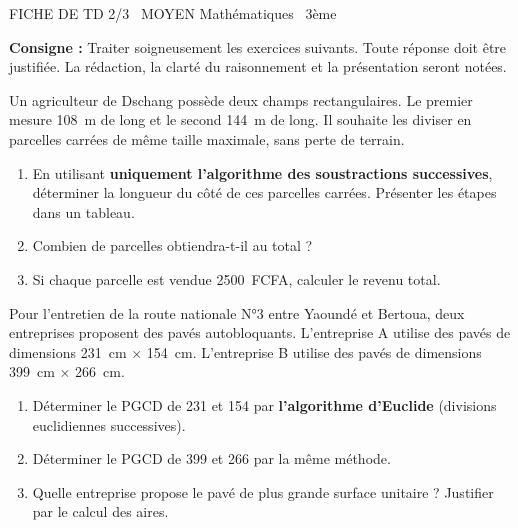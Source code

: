 \documentclass[11pt]{article}
\begin{document}
\begin{tcolorbox}[enhanced,colback=popink,colframe=popink,arc=10pt,boxrule=0pt,left=12pt,right=12pt,top=9pt,bottom=9pt]
{\color{white}\popxbold\small FICHE DE TD 2/3 \textbullet\ MOYEN \hfill Mathématiques \textbullet\ 3ème\par}
\end{tcolorbox}
\vspace{4pt}
\noindent\textbf{Consigne :} Traiter soigneusement les exercices suivants. Toute réponse doit être justifiée. La rédaction, la clarté du raisonnement et la présentation seront notées.

\begin{exercice}
Un agriculteur de Dschang possède deux champs rectangulaires. Le premier mesure \SI{108}{m} de long et le second \SI{144}{m} de long. Il souhaite les diviser en parcelles carrées de même taille maximale, sans perte de terrain.
\begin{enumerate}
    \item En utilisant \textbf{uniquement l'algorithme des soustractions successives}, déterminer la longueur du côté de ces parcelles carrées. Présenter les étapes dans un tableau.
    \item Combien de parcelles obtiendra-t-il au total ?
    \item Si chaque parcelle est vendue \SI{2500}{FCFA}, calculer le revenu total.
\end{enumerate}
\end{exercice}

\begin{exercice}
Pour l'entretien de la route nationale N°3 entre Yaoundé et Bertoua, deux entreprises proposent des pavés autobloquants. L'entreprise A utilise des pavés de dimensions \SI{231}{cm} $\times$ \SI{154}{cm}. L'entreprise B utilise des pavés de dimensions \SI{399}{cm} $\times$ \SI{266}{cm}.
\begin{enumerate}
    \item Déterminer le PGCD de 231 et 154 par \textbf{l'algorithme d'Euclide} (divisions euclidiennes successives).
    \item Déterminer le PGCD de 399 et 266 par la même méthode.
    \item Quelle entreprise propose le pavé de plus grande surface unitaire ? Justifier par le calcul des aires.
\end{enumerate}
\end{exercice}
\end{document}
